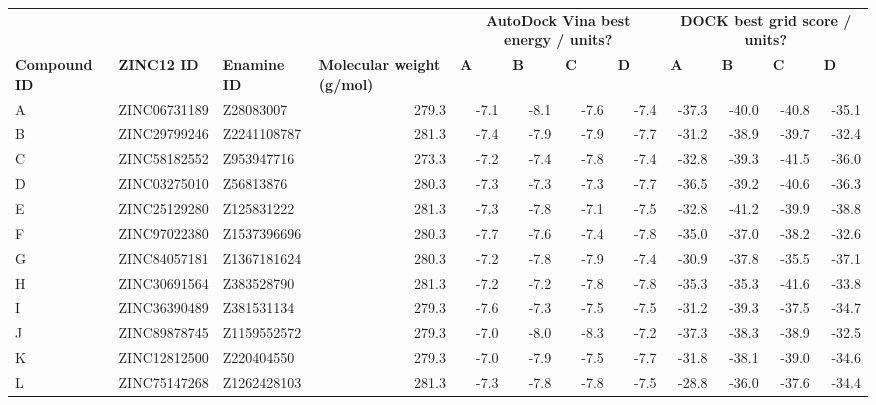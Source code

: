 \begin{sidewaystable}
\centering

\begin{small}
\begin{tabular}{lllrrrrrrrrr}
\hline
      &       &       &       & \multicolumn{4}{c}{\textbf{AutoDock Vina best energy / units?}} & \multicolumn{4}{c}{\textbf{DOCK best grid score / units?}} \\
\textbf{Compound ID} & \textbf{ZINC12 ID} & \textbf{Enamine ID} & \multicolumn{1}{l}{\textbf{Molecular weight (g/mol)}} & \multicolumn{1}{l}{\textbf{A}} & \multicolumn{1}{l}{\textbf{B}} & \multicolumn{1}{l}{\textbf{C}} & \multicolumn{1}{l}{\textbf{D}} & \multicolumn{1}{l}{\textbf{A}} & \multicolumn{1}{l}{\textbf{B}} & \multicolumn{1}{l}{\textbf{C}} & \multicolumn{1}{l}{\textbf{D}} \\
\hline
A     & ZINC06731189 & Z28083007   & 279.3 & -7.1  & -8.1  & -7.6  & -7.4  & -37.3 & -40.0 & -40.8 & -35.1 \\
B     & ZINC29799246 & Z2241108787 & 281.3 & -7.4  & -7.9  & -7.9  & -7.7  & -31.2 & -38.9 & -39.7 & -32.4 \\
C     & ZINC58182552 & Z953947716  & 273.3 & -7.2  & -7.4  & -7.8  & -7.4  & -32.8 & -39.3 & -41.5 & -36.0 \\
D     & ZINC03275010 & Z56813876   & 280.3 & -7.3  & -7.3  & -7.3  & -7.7  & -36.5 & -39.2 & -40.6 & -36.3 \\
E     & ZINC25129280 & Z125831222  & 281.3 & -7.3  & -7.8  & -7.1  & -7.5  & -32.8 & -41.2 & -39.9 & -38.8 \\
F     & ZINC97022380 & Z1537396696 & 280.3 & -7.7  & -7.6  & -7.4  & -7.8  & -35.0 & -37.0 & -38.2 & -32.6 \\
G     & ZINC84057181 & Z1367181624 & 280.3 & -7.2  & -7.8  & -7.9  & -7.4  & -30.9 & -37.8 & -35.5 & -37.1 \\
H     & ZINC30691564 & Z383528790  & 281.3 & -7.2  & -7.2  & -7.8  & -7.8  & -35.3 & -35.3 & -41.6 & -33.8 \\
I     & ZINC36390489 & Z381531134  & 279.3 & -7.6  & -7.3  & -7.5  & -7.5  & -31.2 & -39.3 & -37.5 & -34.7 \\
J     & ZINC89878745 & Z1159552572 & 279.3 & -7.0  & -8.0  & -8.3  & -7.2  & -37.3 & -38.3 & -38.9 & -32.5 \\
K     & ZINC12812500 & Z220404550  & 279.3 & -7.0  & -7.9  & -7.5  & -7.7  & -31.8 & -38.1 & -39.0 & -34.6 \\
L     & ZINC75147268 & Z1262428103 & 281.3 & -7.3  & -7.8  & -7.8  & -7.5  & -28.8 & -36.0 & -37.6 & -34.4 \\

\end{tabular}
\end{small}
\end{sidewaystable}
